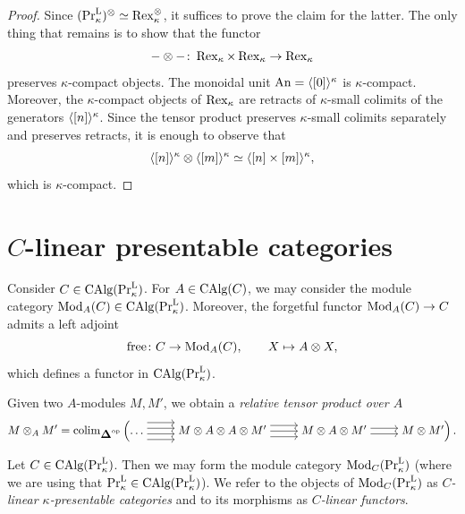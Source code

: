 \documentclass[11pt]{book}
\begin{document}
	\begin{proof}
		Since $(\textup{Pr}^{\textup{L}}_{\kappa})^{\otimes} \simeq \operatorname{Rex}_{\kappa}^{\otimes}$, it suffices to prove the claim for the latter. The only thing that remains is to show that the functor
		\[
			- \otimes -\colon \operatorname{Rex}_{\kappa} \times \operatorname{Rex}_{\kappa} \to \operatorname{Rex}_{\kappa}
		\]
		preserves $\kappa$-compact objects. The monoidal unit ${\textup{An}} = \langle [0] \rangle^{\kappa}$ is $\kappa$-compact. Moreover, the $\kappa$-compact objects of $\operatorname{Rex}_{\kappa}$ are retracts of $\kappa$-small colimits of the generators $\langle [n] \rangle^{\kappa}$. Since the tensor product preserves $\kappa$-small colimits separately and preserves retracts, it is enough to observe that
		\[
			\langle [n] \rangle^{\kappa} \otimes \langle [m] \rangle^{\kappa} \simeq \langle [n] \times [m] \rangle^{\kappa},
		\]
		which is $\kappa$-compact.
	\end{proof}

	\section{\texorpdfstring{$C$}{C}-linear presentable categories}

	Consider $C \in {\textup{CAlg}}(\textup{Pr}^{\textup{L}}_{\kappa})$. For $A \in {\textup{CAlg}}(C)$, we may consider the module category ${\textup{Mod}}_A(C) \in {\textup{CAlg}}(\textup{Pr}^{\textup{L}}_{\kappa})$. Moreover, the forgetful functor ${\textup{Mod}}_A(C) \to C$ admits a left adjoint
	\[
		\operatorname{free}\colon C \to {\textup{Mod}}_A(C), \qquad X \mapsto A \otimes X,
	\]
	which defines a functor in ${\textup{CAlg}}(\textup{Pr}^{\textup{L}}_{\kappa})$.

	Given two $A$-modules $M,M'$, we obtain a \emph{relative tensor product over $A$}
	\[
		M \otimes_A M' = \colim_{\simp\catop}\left(\begin{tikzcd}[ampersand replacement=\&, cramped, arrow style=tikz]
			\dots \ar[r, shift left=3] \ar[r, shift left=1] \ar[r, shift left=-1] \ar[r, shift left=-3] \& M \otimes A \otimes A \otimes M' \ar[r, shift left=2] \ar[r] \ar[r, shift left=-2] \& M \otimes A \otimes M' \ar[r, shift left] \ar[r, shift right] \& M \otimes M'
		\end{tikzcd}\right).
	\]

	\begin{definition}
		Let $C \in {\textup{CAlg}}(\textup{Pr}^{\textup{L}}_{\kappa})$. Then we may form the module category ${\textup{Mod}}_C(\textup{Pr}^{\textup{L}}_{\kappa})$ (where we are using that $\textup{Pr}^{\textup{L}}_{\kappa} \in {\textup{CAlg}}(\textup{Pr}^{\textup{L}}_{\kappa})$). We refer to the objects of ${\textup{Mod}}_C(\textup{Pr}^{\textup{L}}_{\kappa})$ as \emph{$C$-linear $\kappa$-presentable categories} and to its morphisms as \emph{$C$-linear functors}.
	\end{definition}
\end{document}
